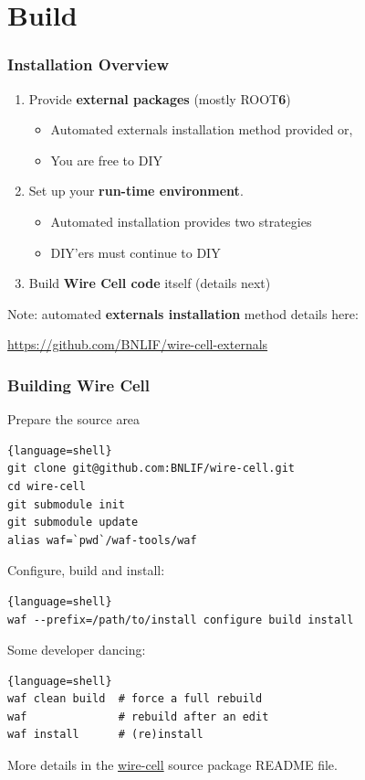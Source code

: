 \documentclass[xcolor=dvipsnames]{beamer}
\begin{document}
\section{Build}

\begin{frame}[fragile]
\end{frame}

\begin{frame}
  \frametitle{Installation Overview}
  \begin{enumerate}
  \item Provide \textbf{external packages} (mostly ROOT\textbf{6})
    \begin{itemize}
    \item Automated externals installation method provided or,
    \item You are free to DIY
    \end{itemize}
  \item Set up your \textbf{run-time environment}.
    \begin{itemize}
    \item Automated installation provides two strategies
    \item DIY'ers must continue to DIY
    \end{itemize}
  \item Build \textbf{Wire Cell code} itself (details next)
  \end{enumerate}


  Note: automated \textbf{externals installation} method details here:
  \begin{center}
    \url{https://github.com/BNLIF/wire-cell-externals}    
  \end{center}
\end{frame}

\begin{frame}[fragile]
  \frametitle{Building Wire Cell}

  Prepare the source area
  \begin{lstlisting}{language=shell}
git clone git@github.com:BNLIF/wire-cell.git
cd wire-cell
git submodule init
git submodule update
alias waf=`pwd`/waf-tools/waf    
  \end{lstlisting}

Configure, build and install:
  \begin{lstlisting}{language=shell}
waf --prefix=/path/to/install configure build install
  \end{lstlisting}

Some developer dancing:

  \begin{lstlisting}{language=shell}
waf clean build  # force a full rebuild
waf              # rebuild after an edit
waf install      # (re)install 
  \end{lstlisting}


  More details in the
  \href{https://github.com/BNLIF/wire-cell}{wire-cell} source package
  README file.

\end{frame}
\end{document}

